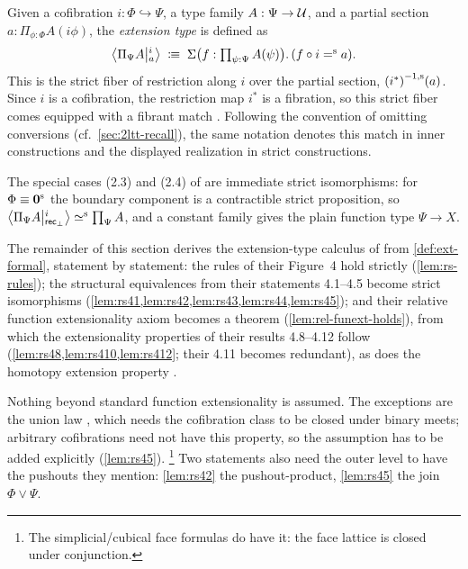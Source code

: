 \begin{definition}\label{def:ext-formal}
	Given a cofibration $i : \Phi \hookrightarrow \Psi$, a type family $A : \Psi \to \UU$, and a partial section $a : \Pi_{\phi:\Phi} A(i \phi)$, the \emph{extension type} is defined as
	\begin{equation}
		\Ext{i}{\Pi_\Psi A}{a}\;\colonequiv\;\Sigma\bigl(f:\textstyle\prod_{\psi:\Psi}A(\psi)\bigr).\,(f\circ i\seq a).
	\end{equation}
	This is the strict fiber of restriction along $i$ over the partial section, $\sfib{(i^*)}(a)$.
	Since $i$ is a cofibration, the restriction map $i^*$ is a fibration, so this strict fiber comes equipped with a fibrant match \citep[Lem.~3.9, 3.18]{2LTT}.
	Following the convention of omitting conversions (cf.~\cref{sec:2ltt-recall}), the same notation denotes this match in inner constructions and the displayed realization in strict constructions.
\end{definition}

The special cases (2.3) and (2.4) of \citet{RS2017} are immediate strict isomorphisms: for
$\Phi \equiv \szero$ the boundary component is a contractible strict
proposition, so $\Ext{i}{\Pi_\Psi A}{\mathsf{rec}_\bot}\siso\prod_\Psi A$, and a
constant family gives the plain function type $\Psi\to X$.

The remainder of this section derives the extension-type calculus of
\citet[\S2.2, \S4]{RS2017} from \cref{def:ext-formal}, statement by statement:
the rules of their Figure~4 hold strictly (\cref{lem:rs-rules}); the structural equivalences from their
statements 4.1--4.5 become strict isomorphisms
(\cref{lem:rs41,lem:rs42,lem:rs43,lem:rs44,lem:rs45}); and their relative function extensionality axiom \citep[Axiom~4.6]{RS2017} becomes a theorem
(\cref{lem:rel-funext-holds}), from which the extensionality properties of their
results 4.8--4.12 follow (\cref{lem:rs48,lem:rs410,lem:rs412}; their
4.11 becomes redundant), as does the homotopy extension property \citep[Prop.~4.10]{RS2017}.

Nothing beyond standard function extensionality is assumed.
The exceptions are the union law \citep[Thm.~4.5]{RS2017}, which needs the cofibration class to be
closed under binary meets; arbitrary cofibrations need not have this property, so the assumption has to be added explicitly (\cref{lem:rs45}).%
\footnote{The simplicial/cubical face formulas do have it: the face lattice is closed under conjunction.}
Two statements also need the outer level to have the pushouts they mention: \cref{lem:rs42} the pushout-product, \cref{lem:rs45} the join $\Phi\vee\Psi$.

